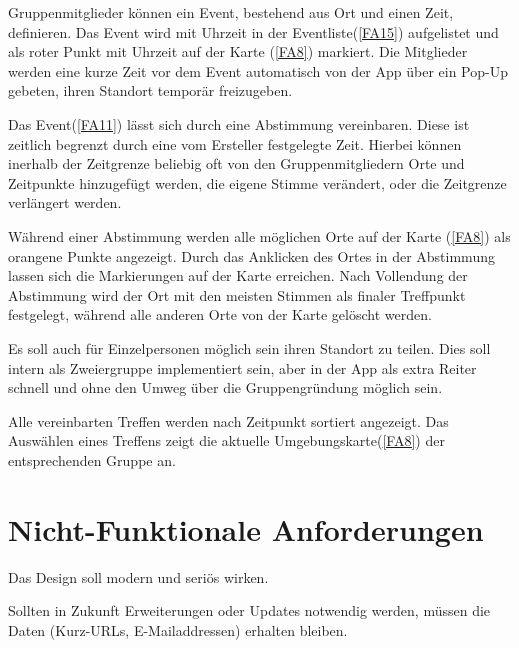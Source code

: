 \documentclass[parskip=full,11pt,twoside]{scrartcl}
\begin{document}
\label{FA11}
Gruppenmitglieder können ein Event, bestehend aus Ort und einen Zeit, definieren. Das Event wird mit Uhrzeit in der Eventliste(\ref{FA15}) aufgelistet und als roter Punkt mit Uhrzeit auf der Karte (\ref{FA8}) markiert. Die Mitglieder werden eine kurze Zeit vor dem Event automatisch von der App über ein Pop-Up gebeten, ihren Standort temporär freizugeben.

\label{FA12}
Das Event(\ref{FA11}) lässt sich durch eine Abstimmung vereinbaren. Diese ist zeitlich begrenzt durch eine vom Ersteller festgelegte Zeit. Hierbei können inerhalb der Zeitgrenze beliebig oft von den Gruppenmitgliedern Orte und Zeitpunkte hinzugefügt werden, die eigene Stimme verändert, oder die Zeitgrenze verlängert werden.

\label{FA13}
Während einer Abstimmung werden alle möglichen Orte auf der Karte (\ref{FA8}) als orangene Punkte angezeigt. Durch das Anklicken des Ortes in der Abstimmung lassen sich die Markierungen auf der Karte erreichen. Nach Vollendung der Abstimmung wird der Ort mit den meisten Stimmen als finaler Treffpunkt festgelegt, während alle anderen Orte von der Karte gelöscht werden.

\label{FA14}
Es soll auch für Einzelpersonen möglich sein ihren Standort zu teilen. Dies soll intern als Zweiergruppe implementiert sein, aber in der App als extra Reiter schnell und ohne den Umweg über die Gruppengründung möglich sein.

\label{FA15}
Alle vereinbarten Treffen werden nach Zeitpunkt sortiert angezeigt. Das Auswählen eines Treffens zeigt die aktuelle Umgebungskarte(\ref{FA8}) der entsprechenden Gruppe an.

\section{Nicht-Funktionale Anforderungen}


Das Design soll modern und seriös wirken.


Sollten in Zukunft Erweiterungen oder Updates notwendig werden,
müssen die Daten (Kurz-URLs, E-Mailaddressen) erhalten bleiben.
\end{document}
